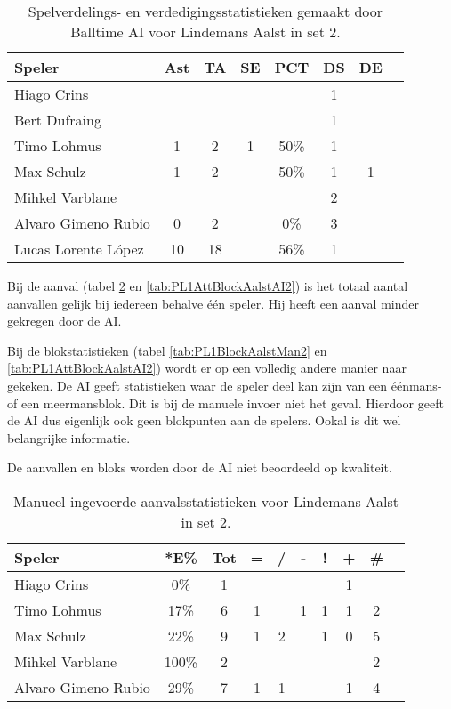 \begin{table}[ht!]
  \centering
  \scriptsize
  \begin{tabular}{|l|c|c|c|c|c|c|c|} \hline
    \textbf{Speler} & Ast & TA & SE & PCT & DS & DE \\ \hline
    Hiago Crins &  &  &  &  & 1 &  \\
    Bert Dufraing &  &  &  &  & 1 &  \\ 
    Timo Lohmus & 1 & 2 & 1 & 50\% & 1 &  \\
    Max Schulz & 1 & 2 &  & 50\% & 1 & 1 \\
    Mihkel Varblane &  &  &  &  & 2 &  \\
    Alvaro Gimeno Rubio & 0 & 2 &  & 0\% & 3 &  \\
    Lucas Lorente López & 10 & 18 &  & 56\% & 1 &  \\ \hline
  \end{tabular}
  \caption[Spelverdelings- en verdedigingsstatistieken gemaakt door Balltime AI voor Lindemans Aalst in set 2]{\label{tab:PL1SetDigAalstAI2}Spelverdelings- en verdedigingsstatistieken gemaakt door Balltime AI voor Lindemans Aalst in set 2.}
\end{table}

Bij de aanval (tabel \ref{tab:PL1AttAalstMan2} en \ref{tab:PL1AttBlockAalstAI2}) is het totaal aantal aanvallen gelijk bij iedereen behalve één speler. Hij heeft een aanval minder gekregen door de AI. 

Bij de blokstatistieken (tabel \ref{tab:PL1BlockAalstMan2} en \ref{tab:PL1AttBlockAalstAI2}) wordt er op een volledig andere manier naar gekeken. De AI geeft statistieken waar de speler deel kan zijn van een éénmans- of een meermansblok. Dit is bij de manuele invoer niet het geval. Hierdoor geeft de AI dus eigenlijk ook geen blokpunten aan de spelers. Ookal is dit wel belangrijke informatie.

De aanvallen en bloks worden door de AI niet beoordeeld op kwaliteit.

\begin{table}[ht!]
  \centering
  \scriptsize
    \begin{tabular}{|l|c|c|c|c|c|c|c|c|c|}
      \hline
      \textbf{Speler} & *E\% & Tot & = & / & - & ! & + & \# \\ \hline
      Hiago Crins  & 0\% & 1 &  &  &  &  & 1 &  \\ 
      Timo Lohmus  & 17\% & 6 & 1 &  & 1 & 1 & 1 & 2 \\ 
      Max Schulz  & 22\% & 9 & 1 & 2 &  & 1 & 0 & 5\\
      Mihkel Varblane  & 100\% & 2 &  &  &  &  &  & 2 \\ 
      Alvaro Gimeno Rubio & 29\% & 7 & 1 & 1 &  &  & 1 & 4 \\ \hline 
  \end{tabular}
\caption[Manueel ingevoerde aanvalsstatistieken voor Lindemans Aalst in set 2]{\label{tab:PL1AttAalstMan2}Manueel ingevoerde aanvalsstatistieken voor Lindemans Aalst in set 2.}
\end{table}

